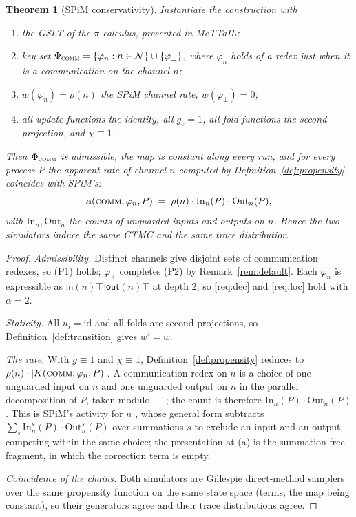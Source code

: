 \documentclass[11pt,a4paper]{article}
\theoremstyle{plain}
\newtheorem{theorem}{Theorem}
\theoremstyle{definition}
\theoremstyle{remark}
\newcommand{\sepc}{\mathbin{\big|}}
\newcommand{\out}{\mathsf{out}}
\newcommand{\inn}{\mathsf{in}}
\newcommand{\prop}{\mathbf{a}}
\newcommand{\wmap}{w}
\newcommand{\gfac}{g}
\begin{document}
\begin{theorem}[SPiM conservativity]
\label{thm:spim}
Instantiate the construction with
\begin{enumerate}[label=(\alph*),leftmargin=2.2em]
\item the GSLT of the $\pi$-calculus, presented in MeTTaIL;
\item key set $\Phi_{\textsc{comm}} = \{\varphi_n : n \in \mathcal{N}\} \cup \{\varphi_\bot\}$, where
$\varphi_n$ holds of a redex just when it is a communication on the channel $n$;
\item $\wmap(\varphi_n) = \rho(n)$ the SPiM channel rate, $\wmap(\varphi_\bot) = 0$;
\item all update functions the identity, all $\gfac_c = 1$, all fold functions the second projection,
and $\chi \equiv 1$.
\end{enumerate}
Then $\Phi_{\textsc{comm}}$ is admissible, the map is constant along every run, and for every process
$P$ the apparent rate of channel $n$ computed by Definition~\ref{def:propensity} coincides with
SPiM's:
\[
\prop(\textsc{comm}, \varphi_n, P) \;=\; \rho(n)\cdot \mathrm{In}_n(P)\cdot \mathrm{Out}_n(P),
\]
with $\mathrm{In}_n, \mathrm{Out}_n$ the counts of unguarded inputs and outputs on $n$. Hence the
two simulators induce the same CTMC and the same trace distribution.
\end{theorem}

\begin{proof}
\emph{Admissibility.} Distinct channels give disjoint sets of communication redexes, so (P1) holds;
$\varphi_\bot$ completes (P2) by Remark~\ref{rem:default}. Each $\varphi_n$ is expressible as
$\inn(n)\top \sepc \out(n)\top$ at depth $2$, so \ref{req:dec} and \ref{req:loc} hold with
$\alpha = 2$.

\emph{Staticity.} All $u_i = \mathrm{id}$ and all folds are second projections, so
Definition~\ref{def:transition} gives $\wmap' = \wmap$.

\emph{The rate.} With $\gfac \equiv 1$ and $\chi \equiv 1$,
Definition~\ref{def:propensity} reduces to $\rho(n)\cdot|K(\textsc{comm},\varphi_n,P)|$. A
communication redex on $n$ is a choice of one unguarded input on $n$ and one unguarded output on $n$
in the parallel decomposition of $P$, taken modulo $\equiv$; the count is therefore
$\mathrm{In}_n(P)\cdot\mathrm{Out}_n(P)$. This is SPiM's activity for $n$ \cite{spim-sim}, whose
general form subtracts $\sum_{s}\mathrm{In}_n^s(P)\cdot\mathrm{Out}_n^s(P)$ over summations $s$ to
exclude an input and an output competing within the same choice; the presentation at (a) is the
summation-free fragment, in which the correction term is empty.

\emph{Coincidence of the chains.} Both simulators are Gillespie direct-method samplers over the same
propensity function on the same state space (terms, the map being constant), so their generators
agree and their trace distributions agree.
\end{proof}
\end{document}
